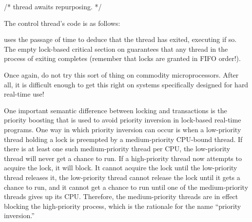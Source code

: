 {{\begin{VerbatimN}
	/* thread awaits repurposing. */
\end{VerbatimN}

	The control thread's code is as follows:

\begin{fcvlabel}
\end{fcvlabel}

	\begin{fcvref}
	 uses the passage of time to deduce that the thread
	has exited, executing  if so.
	The empty lock-based critical section on 
	guarantees that any thread in the process of exiting
	completes (remember that locks are granted in FIFO order!).
	\end{fcvref}

	Once again, do not try this sort of thing on commodity
	microprocessors.
	After all, it is difficult enough to get this right on systems
	specifically designed for hard real-time use!
}\QuickQuizEndE
}

One important semantic difference between locking and transactions
is the priority boosting that is used to avoid priority inversion
in lock-based real-time programs.
One way in which priority inversion can occur is when a
low-priority thread holding a lock
is preempted by a medium-priority CPU-bound thread.
If there is at least one such medium-priority thread per CPU, the
low-priority thread will never get a chance to run.
If a high-priority thread now attempts to acquire the lock,
it will block.
It cannot acquire the lock until the low-priority thread releases it,
the low-priority thread cannot release the lock until it gets a chance
to run, and it cannot get a chance to run until one of the medium-priority
threads gives up its CPU.
Therefore, the medium-priority threads are in effect blocking the
high-priority process, which is the rationale for the name ``priority
inversion.''

